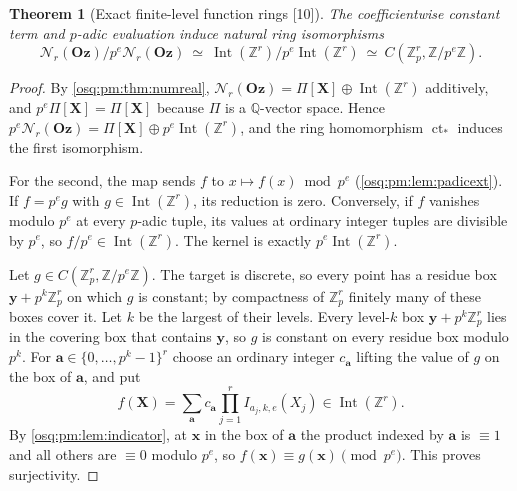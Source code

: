 \documentclass[11pt,letterpaper]{article}
\numberwithin{equation}{section}
\newtheorem{theorem}{Theorem}[section]
\theoremstyle{definition}
\theoremstyle{remark}
\theoremstyle{plain}
\newcommand{\Oz}{\mathbf{Oz}}
\newcommand{\Z}{\mathbb Z}
\newcommand{\Q}{\mathbb Q}
\newcommand{\ct}{\operatorname{ct}}
\newcommand{\Int}{\operatorname{Int}}
\newcommand{\Num}{\mathscr N}
\newcommand{\src}[1]{\textup{\textsf{[#1]}}}
\begin{document}
\begin{theorem}[Exact finite-level function rings \src{10}]\label{osq:pm:thm:finitelevel}
The coefficientwise constant term and $p$-adic evaluation induce natural ring
isomorphisms
\begin{equation}\label{osq:pm:eq:finitelevel}
 \Num_r(\Oz)/p^e\Num_r(\Oz)\ \simeq\ \Int(\Z^r)/p^e\Int(\Z^r)
 \ \simeq\ C(\Z_p^r,\Z/p^e\Z).
\end{equation}
\end{theorem}
\begin{proof}
By \cref{osq:pm:thm:numreal}, $\Num_r(\Oz)=\Pi[\mathbf X]\oplus\Int(\Z^r)$ additively,
and $p^e\Pi[\mathbf X]=\Pi[\mathbf X]$ because $\Pi$ is a $\Q$-vector space. Hence
$p^e\Num_r(\Oz)=\Pi[\mathbf X]\oplus p^e\Int(\Z^r)$, and the ring homomorphism $\ct_*$
induces the first isomorphism.

For the second, the map sends $f$ to $x\mapsto f(x)\bmod p^e$
(\cref{osq:pm:lem:padicext}). If $f=p^eg$ with $g\in\Int(\Z^r)$, its reduction is zero.
Conversely, if $f$ vanishes modulo $p^e$ at every $p$-adic tuple, its values at ordinary
integer tuples are divisible by $p^e$, so $f/p^e\in\Int(\Z^r)$. The kernel is exactly
$p^e\Int(\Z^r)$.

Let $g\in C(\Z_p^r,\Z/p^e\Z)$. The target is discrete, so every point has a residue box
$\mathbf y+p^{k}\Z_p^r$ on which $g$ is constant; by compactness of $\Z_p^r$ finitely many
of these boxes cover it. Let $k$ be the largest of their levels. Every level-$k$ box
$\mathbf y+p^k\Z_p^r$ lies in the covering box that contains $\mathbf y$, so $g$ is
constant on every residue box modulo $p^k$. For
$\mathbf a\in\{0,\dots,p^k-1\}^r$ choose an ordinary integer $c_{\mathbf a}$ lifting the
value of $g$ on the box of $\mathbf a$, and put
\[
 f(\mathbf X)=\sum_{\mathbf a}c_{\mathbf a}\prod_{j=1}^rI_{a_j,k,e}(X_j)\in\Int(\Z^r).
\]
By \cref{osq:pm:lem:indicator}, at $\mathbf x$ in the box of $\mathbf a$ the product
indexed by $\mathbf a$ is $\equiv1$ and all others are $\equiv0$ modulo $p^e$, so
$f(\mathbf x)\equiv g(\mathbf x)\pmod{p^e}$. This proves surjectivity.
\end{proof}
\end{document}
